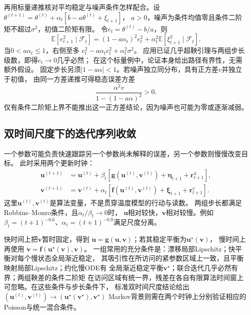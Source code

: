 再用标量递推核对平均稳定与噪声条件怎样配合。设
$\theta^{(t+1)}=\theta^{(t)}+\alpha_t[b-a\theta^{(t)}+\xi_{t+1}]$，
$a>0$，噪声为条件均值零且条件二阶矩不超过$\sigma^2$，初值二阶矩有限。
令$e_t=\theta^{(t)}-b/a$，则
\[
  \mathbb E[e_{t+1}^2\mid\mathcal F_t]
  =(1-a\alpha_t)^2e_t^2+
       \alpha_t^2\mathbb E[\xi_{t+1}^2\mid\mathcal F_t].
\]
当$0<a\alpha_t\leq1$，右侧至多
$e_t^2-a\alpha_te_t^2+\alpha_t^2\sigma^2$。
应用已证几乎超鞅引理与两组步长级数，即得$e_t\to0$几乎必然；
在这个标量例中，论证本身给出路径有界性，无需额外假设。
固定步长另须$|1-a\alpha|<1$。若噪声独立同分布，具有正方差$v$并独立于初值，
由同一方差递推可得稳态误差方差
\[
 \frac{\alpha^2v}{1-(1-a\alpha)^2}>0.
\]
仅有条件二阶矩上界不能推出这一正方差结论，因为噪声也可能为零或逐渐减弱。

\subsection{双时间尺度下的迭代序列收敛}
\label{sec:action-state-two-timescale}

一个参数可能负责快速跟踪另一个参数尚未解释的误差，另一个参数则慢慢改变目标。
此时采用两个更新时钟：
\begin{align*}
  \bm u^{(t+1)}
    &=\bm u^{(t)}+\beta_t[
        \bm g(\bm u^{(t)},\bm v^{(t)})+\bm\eta_{t+1}+\bm r^u_{t+1}],\\
  \bm v^{(t+1)}
    &=\bm v^{(t)}+\alpha_t[
        \bm f(\bm u^{(t)},\bm v^{(t)})+\bm\xi_{t+1}+\bm r^v_{t+1}].
\end{align*}
这里$\bm u^{(t)},\bm v^{(t)}$是算法变量，不是贯穿温度模型的行动与读数。
两组步长都满足Robbins--Monro条件，且$\alpha_t/\beta_t\to0$时，
$\bm u$相对较快，$\bm v$相对较慢。例如
$\beta_t=(t+1)^{-0.6}$、$\alpha_t=(t+1)^{-0.9}$满足尺度分离。

快时间上把$\bm v$暂时固定，得到
$\dot{\bm u}=\bm g(\bm u,\bm v)$；若其稳定平衡为$\bm u^\star(\bm v)$，
慢时间上再使用
$\dot{\bm v}=\bm f(\bm u^\star(\bm v),\bm v)$。
一组常用的充分条件是：漂移局部Lipschitz；快平衡对每个慢状态全局渐近稳定，
其吸引性在所访问的紧参数区域上一致，且平衡映射局部Lipschitz；约化慢ODE有
全局渐近稳定平衡$\bm v^\star$；联合迭代几乎必然有界；两组鞅差的条件二阶矩
在访问区域有统一界，残差在各自有限算法时间窗上可忽略。在这些条件与步长条件下，
标准双时间尺度结论给出
$(\bm u^{(t)},\bm v^{(t)})\to
(\bm u^\star(\bm v^\star),\bm v^\star)$
Markov背景则需在两个时钟上分别验证相应的Poisson与统一混合条件。

